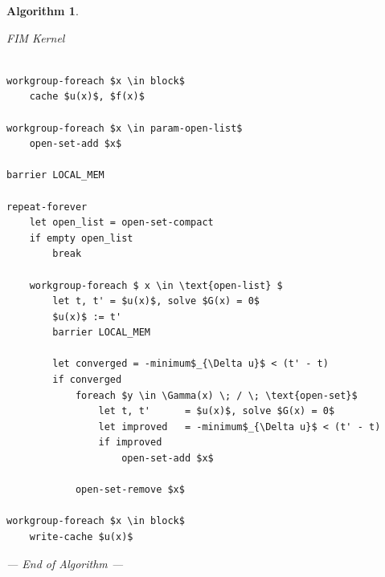 \documentclass[11pt]{article}       %
\newcommand\clearlines[1]{%
	\if#10\else%
	\leavevmode\\%
	\expandafter\clearlines\expandafter{\the\numexpr#1-1}%
	\fi}
\newtheorem{algX}{Algorithm}
\newenvironment{algorithm}       {\begin{algX}\begin{em}}%
                                 {\par\noindent --- End of Algorithm ---
                                 \end{em}\end{algX}}
\begin{document}
\begin{algorithm}
	\caption{FIM Kernel}
	\label{alg:kernel_fim}
	\begin{center}
		\footnotesize

		\begin{minipage}{.80\linewidth}
			\begin{lstlisting}[style=code]
			
workgroup-foreach $x \in block$
    cache $u(x)$, $f(x)$

workgroup-foreach $x \in param-open-list$
    open-set-add $x$

barrier LOCAL_MEM

repeat-forever
    let open_list = open-set-compact
    if empty open_list
        break
    
    workgroup-foreach $ x \in \text{open-list} $
        let t, t' = $u(x)$, solve $G(x) = 0$ 
	    $u(x)$ := t'
        barrier LOCAL_MEM
        
        let converged = -minimum$_{\Delta u}$ < (t' - t)
        if converged
            foreach $y \in \Gamma(x) \; / \; \text{open-set}$
                let t, t'      = $u(x)$, solve $G(x) = 0$ 
                let improved   = -minimum$_{\Delta u}$ < (t' - t)
                if improved
                    open-set-add $x$
            
            open-set-remove $x$

workgroup-foreach $x \in block$
    write-cache $u(x)$
			\end{lstlisting}
			\hfill
		\end{minipage}
	\end{center}
\end{algorithm}
\FloatBarrier

\end{document}

